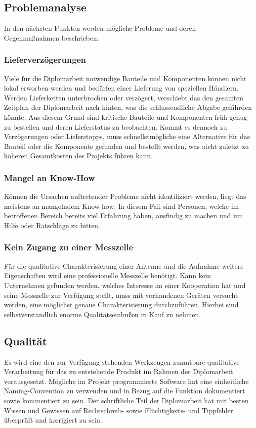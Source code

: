 \subsection{Problemanalyse}
In den nächsten Punkten werden mögliche Probleme und deren Gegenmaßnahmen beschrieben.  

\subsubsection{Lieferverzögerungen}
Viele für die Diplomarbeit notwendige Bauteile und Komponenten können nicht lokal erworben 
werden und bedürfen einer Lieferung von speziellen Händlern. Werden Lieferketten unterbrochen 
oder verzögert, verschiebt das den gesamten Zeitplan der Diplomarbeit nach hinten, was die 
schlussendliche Abgabe gefährden könnte. Aus diesem Grund sind kritische Bauteile und 
Komponenten früh genug zu bestellen und deren Lieferstatus zu beobachten. Kommt es dennoch zu 
Verzögerungen oder Lieferstopps, muss schnellstmögliche eine Alternative für das Bauteil oder die 
Komponente gefunden und bestellt werden, was nicht zuletzt zu höheren Gesamtkosten des Projekts 
führen kann.

\subsubsection{Mangel an Know-How}
Können die Ursachen auftretender Probleme nicht identifiziert werden, liegt das meistens an 
mangelndem Know-how. In diesem Fall sind Personen, welche im betroffenen Bereich bereits viel 
Erfahrung haben, ausfindig zu machen und um Hilfe oder Ratschläge zu bitten. 

\subsubsection{Kein Zugang zu einer Messzelle}
Für die qualitative Charakterisierung einer Antenne und die Aufnahme weitere Eigenschaften wird eine 
professionelle Messzelle benötigt. Kann kein Unternehmen gefunden werden, welches Interesse an 
einer Kooperation hat und seine Messzelle zur Verfügung stellt, muss mit vorhandenen Geräten 
versucht werden, eine möglichst genaue Charakterisierung durchzuführen. Hierbei sind 
selbstverständlich enorme Qualitätseinbußen in Kauf zu nehmen. 

\subsection{Qualität}
Es wird eine den zur Verfügung stehenden Werkzeugen zumutbare qualitative Verarbeitung für das zu 
entstehende Produkt im Rahmen der Diplomarbeit vorausgesetzt. Mögliche im Projekt programmierte 
Software hat eine einheitliche Naming-Convention zu verwenden und in Bezug auf die Funktion 
dokumentiert sowie kommentiert zu sein. Der schriftliche Teil der Diplomarbeit hat mit besten Wissen 
und Gewissen auf Rechtschreib- sowie Flüchtigkeits- und Tippfehler überprüft und korrigiert zu sein.

